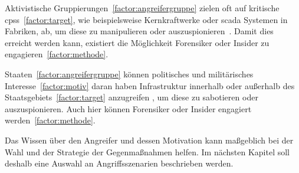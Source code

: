 \documentclass[final,bibliography=totocnumbered]{include/sikseminar}
\newcommand{\cps}{\glspl{cps}\xspace}
\begin{document}
    Aktivistische Gruppierungen~\ref{factor:angreifergruppe} zielen oft auf kritische \cps~\ref{factor:target}, wie beispielsweise Kernkraftwerke oder \gls{scada} Systemen in Fabriken, ab, um diese zu manipulieren oder auszuspionieren~\cite{CAS+09,HLL+17}.
    Damit dies erreicht werden kann, existiert die Möglichkeit Forensiker oder Insider zu engagieren~\ref{factor:methode}.~\cite{WYX+10}

    Staaten~\ref{factor:angreifergruppe} können politisches und militärisches Interesse~\ref{factor:motiv} daran haben Infrastruktur innerhalb oder außerhalb des Staatsgebiets~\ref{factor:target} anzugreifen \cite{CAS+09}, um diese zu sabotieren oder auszuspionieren.
    Auch hier können Forensiker oder Insider engagiert werden~\ref{factor:methode}.

    Das Wissen über den Angreifer und dessen Motivation kann maßgeblich bei der Wahl und der Strategie der Gegenmaßnahmen helfen.
    Im nächsten Kapitel soll deshalb eine Auswahl an Angriffsszenarien beschrieben werden.
\end{document}
